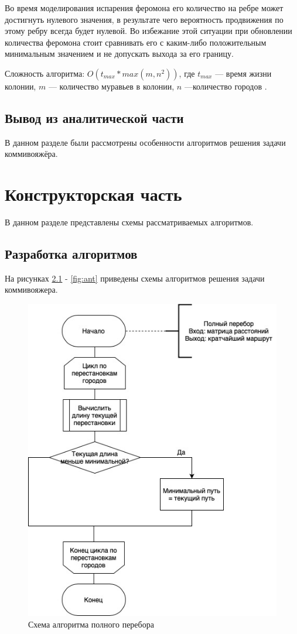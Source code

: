 \documentclass[12pt]{report}
\begin{document}
Во время моделирования испарения феромона его количество на ребре может достигнуть нулевого значения, в результате чего вероятность продвижения по этому ребру всегда будет нулевой. Во избежание этой ситуации при обновлении количества феромона стоит сравнивать его с каким-либо положительным  минимальным значением и не допускать выхода за его границу.

Сложность алгоритма: $O(t_{max} * max(m, n^2))$, где $t_{max}$ --- время жизни колонии, $m$ --- количество муравьев в колонии, $n$ ---количество городов \cite{ulyanov}.

\section{Вывод из аналитической части}
В данном разделе были рассмотрены особенности алгоритмов решения задачи коммивояжёра.

\chapter{Конструкторская часть}
	
В данном разделе представлены схемы рассматриваемых алгоритмов.
	
\section{Разработка алгоритмов}
	
На рисунках \ref{fig:bruteforce} - \ref{fig:ant} приведены схемы алгоритмов решения задачи коммивояжера.

\begin{figure}[H]
		\centering
		\includegraphics[scale=0.7]{dg-brute.jpg}
		\caption{Схема алгоритма полного перебора}
		\label{fig:bruteforce}
\end{figure}
\end{document}
